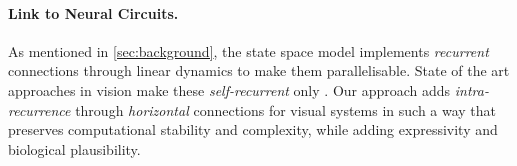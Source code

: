 \paragraph{Link to Neural Circuits.} As mentioned in \cref{sec:background}, the state space model implements \emph{recurrent} connections through linear dynamics to make them parallelisable. State of the art approaches in vision make these \emph{self-recurrent} only \citep{TODO}. Our approach adds \emph{intra-recurrence} through \emph{horizontal} connections for visual systems in such a way that preserves computational stability and complexity, while adding expressivity and biological plausibility.
